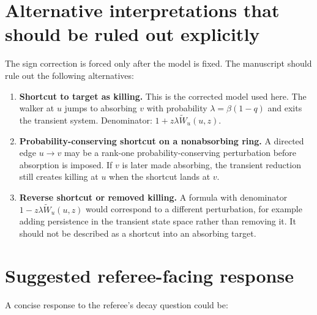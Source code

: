 \documentclass[11pt]{article}
\newcommand{\wt}{\widetilde}
\begin{document}
\section{Alternative interpretations that should be ruled out explicitly}

The sign correction is forced only after the model is fixed.  The manuscript should rule out the
following alternatives:
\begin{enumerate}
  \item \textbf{Shortcut to target as killing.}  This is the corrected model used here.  The walker
  at $u$ jumps to absorbing $v$ with probability $\lambda=\beta(1-q)$ and exits the transient
  system.  Denominator: $1+z\lambda\wt W_u(u,z)$.
  \item \textbf{Probability-conserving shortcut on a nonabsorbing ring.}  A directed edge $u\to v$
  may be a rank-one probability-conserving perturbation before absorption is imposed.  If $v$ is
  later made absorbing, the transient reduction still creates killing at $u$ when the shortcut lands
  at $v$.
  \item \textbf{Reverse shortcut or removed killing.}  A formula with denominator
  $1-z\lambda\wt W_u(u,z)$ would correspond to a different perturbation, for example adding
  persistence in the transient state space rather than removing it.  It should not be described as
  a shortcut into an absorbing target.
\end{enumerate}

\section{Suggested referee-facing response}

A concise response to the referee's decay question could be:
\end{document}
